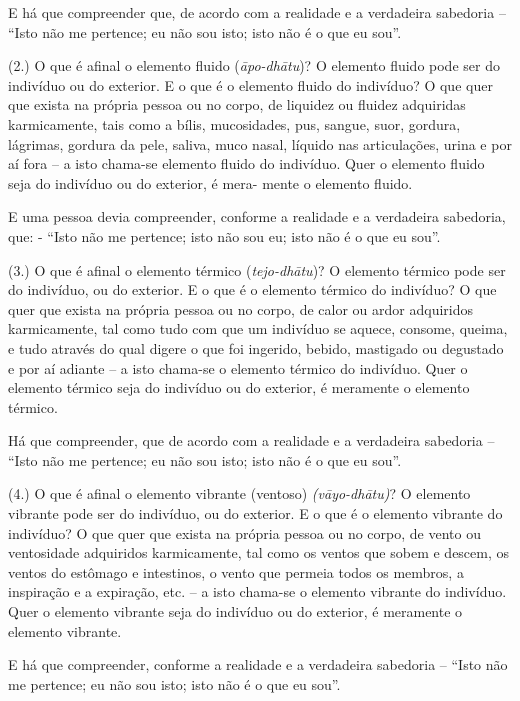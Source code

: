 E há que compreender que, de acordo com a realidade e a verdadeira sabedoria --
``Isto não me pertence; eu não sou isto; isto não é o que eu sou''.

(2.) O que é afinal o elemento fluido (\emph{āpo-dhātu})? O elemento fluido pode
ser do indivíduo ou do exterior. E o que é o elemento fluido do indivíduo? O que
quer que exista na própria pessoa ou no corpo, de liquidez ou fluidez adquiridas
karmicamente, tais como a bílis, mucosidades, pus, sangue, suor, gordura,
lágrimas, gordura da pele, saliva, muco nasal, líquido nas articulações, urina e
por aí fora -- a isto chama-se elemento fluido do indivíduo. Quer o elemento
fluido seja do indivíduo ou do exterior, é mera- mente o elemento fluido.

E uma pessoa devia compreender, conforme a realidade e a verdadeira sabedoria,
que: - ``Isto não me pertence; isto não sou eu; isto não é o que eu sou''.

(3.) O que é afinal o elemento térmico (\emph{tejo-dhātu})? O elemento térmico
pode ser do indivíduo, ou do exterior. E o que é o elemento térmico do
indivíduo? O que quer que exista na própria pessoa ou no corpo, de calor ou
ardor adquiridos karmicamente, tal como tudo com que um indivíduo se aquece,
consome, queima, e tudo através do qual digere o que foi ingerido, bebido,
mastigado ou degustado e por aí adiante -- a isto chama-se o elemento térmico do
indivíduo. Quer o elemento térmico seja do indivíduo ou do exterior, é meramente
o elemento térmico.

Há que compreender, que de acordo com a realidade e a verdadeira sabedoria --
``Isto não me pertence; eu não sou isto; isto não é o que eu sou''.

\enlargethispage{\baselineskip}

(4.) O que é afinal o elemento vibrante (ventoso) \emph{(vāyo-dhātu)}? O
elemento vibrante pode ser do indivíduo, ou do exterior. E o que é o elemento
vibrante do indivíduo? O que quer que exista na própria pessoa ou no corpo, de
vento ou ventosidade adquiridos karmicamente, tal como os ventos que sobem e
descem, os ventos do estômago e intestinos, o vento que permeia todos os
membros, a inspiração e a expiração, etc. -- a isto chama-se o elemento vibrante
do indivíduo. Quer o elemento vibrante seja do indivíduo ou do exterior, é
meramente o elemento vibrante.

E há que compreender, conforme a realidade e a verdadeira sabedoria -- ``Isto
não me pertence; eu não sou isto; isto não é o que eu sou''.

